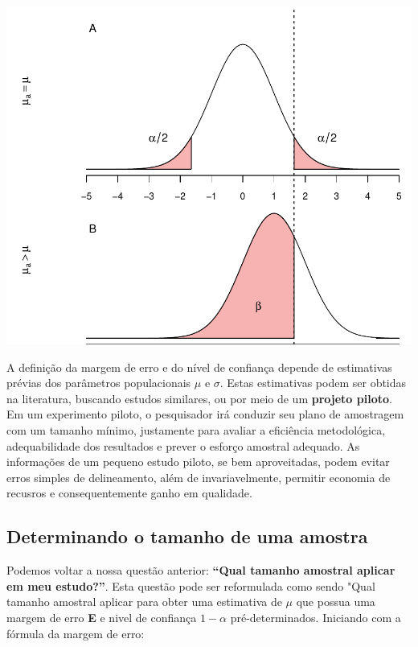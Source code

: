 \documentclass[
]{book}
\begin{document}
\begin{center}\includegraphics{probest-cambientais_files/figure-latex/unnamed-chunk-123-1} \end{center}

A definição da margem de erro e do nível de confiança depende de estimativas prévias dos parâmetros populacionais \(\mu\) e \(\sigma\). Estas estimativas podem ser obtidas na literatura, buscando estudos similares, ou por meio de um \textbf{projeto piloto}. Em um experimento piloto, o pesquisador irá conduzir seu plano de amostragem com um tamanho mínimo, justamente para avaliar a eficiência metodológica, adequabilidade dos resultados e prever o esforço amostral adequado. As informações de um pequeno estudo piloto, se bem aproveitadas, podem evitar erros simples de delineamento, além de invariavelmente, permitir economia de recusros e consequentemente ganho em qualidade.

\hypertarget{determinando-o-tamanho-de-uma-amostra}{%
\subsection{Determinando o tamanho de uma amostra}\label{determinando-o-tamanho-de-uma-amostra}}

Podemos voltar a nossa questão anterior: \textbf{``Qual tamanho amostral aplicar em meu estudo?''}. Esta questão pode ser reformulada como sendo "Qual tamanho amostral aplicar para obter uma estimativa de \(\mu\) que possua uma margem de erro \textbf{E} e nivel de confiança \(1-\alpha\) pré-determinados. Iniciando com a fórmula da margem de erro:
\end{document}
